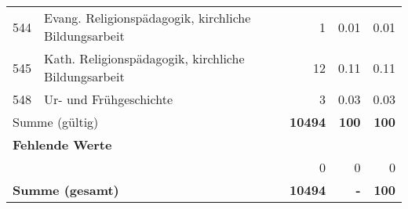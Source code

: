 \begin{longtable}{lXrrr}
        544 & \multicolumn{1}{X}{Evang. Religionspädagogik, kirchliche Bildungsarbeit} & %
          \num{1} &
          \num[round-mode=places,round-precision=2]{0,01} &
          \num[round-mode=places,round-precision=2]{0,01} \\

        545 & \multicolumn{1}{X}{Kath. Religionspädagogik, kirchliche Bildungsarbeit} & %
          \num{12} &
          \num[round-mode=places,round-precision=2]{0,11} &
          \num[round-mode=places,round-precision=2]{0,11} \\

        548 & \multicolumn{1}{X}{Ur- und Frühgeschichte} & %
          \num{3} &
          \num[round-mode=places,round-precision=2]{0,03} &
          \num[round-mode=places,round-precision=2]{0,03} \\

     \midrule
     \multicolumn{2}{l}{Summe (gültig)} &
       \textbf{\num{10494}} &
     \textbf{100} &
       \textbf{\num[round-mode=places,round-precision=2]{100}} \\
     \multicolumn{5}{l}{\textbf{Fehlende Werte}}\\
      & & 0 & 0 & 0 \\
     \midrule
     \multicolumn{2}{l}{\textbf{Summe (gesamt)}} &
          \textbf{\num{10494}} &
        \textbf{-} &
        \textbf{100} \\
     \bottomrule
     \end{longtable}
     
